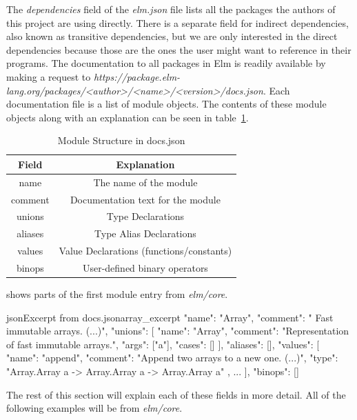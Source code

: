 \documentclass[../thesis.tex]{subfiles}
\begin{document}
The \textit{dependencies} field of the \textit{elm.json} file lists all the packages the authors of this project
are using directly.
There is a separate field for indirect dependencies, also known as transitive dependencies, 
but we are only interested in the direct dependencies because those are the ones the user might want to
reference in their programs.
The documentation to all packages in Elm is readily available by making a request to
\textit{https://package.elm-lang.org/packages/<author>/<name>/<version>/docs.json}.
Each documentation file is a list of module objects.
The contents of these module objects along with an explanation can be seen in table~\ref{tab:documentation_fields}.

\begin{table}[htpb]
    \centering
    \begin{tabular}{|c|c|}
        \hline
        Field & Explanation \\
        \hline
        name & The name of the module \\
        comment & Documentation text for the module \\
        unions & Type Declarations \\
        aliases & Type Alias Declarations \\
        values & Value Declarations (functions/constants) \\
        binops & User-defined binary operators \\
        \hline
    \end{tabular}
    \caption{Module Structure in docs.json}
    \label{tab:documentation_fields}
\end{table}


 shows parts of the first module entry from \textit{elm/core}.
\begin{code}{json}{Excerpt from docs.json}{array_excerpt}
  {
    "name": "Array",
    "comment": " Fast immutable arrays. (...)",
    "unions": [
      {
        "name": "Array",
        "comment": "Representation of fast immutable arrays.",
        "args": ["a"],
        "cases": []
      }
    ],
    "aliases": [],
    "values": [
      {
        "name": "append",
        "comment": "Append two arrays to a new one. (...)",
        "type": 
            "Array.Array a -> Array.Array a -> Array.Array a"
      },
      ...
    ],
    "binops": []
  }
\end{code}
The rest of this section will explain each of these fields in more detail.
All of the following examples will be from \textit{elm/core}.
\end{document}
